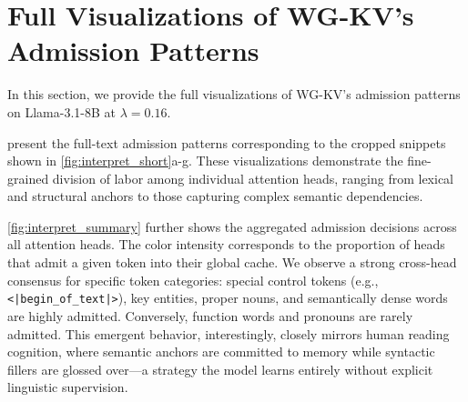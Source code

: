 \section{Full Visualizations of WG-KV's Admission Patterns}
\label{app:interpret}

In this section, we provide the full visualizations of WG-KV's admission patterns on Llama-3.1-8B at $\lambda=0.16$. 

 present the full-text admission patterns corresponding to the cropped snippets shown in \cref{fig:interpret_short}a-g. These visualizations demonstrate the fine-grained division of labor among individual attention heads, ranging from lexical and structural anchors to those capturing complex semantic dependencies.

\cref{fig:interpret_summary} further shows the aggregated admission decisions across all attention heads. The color intensity corresponds to the proportion of heads that admit a given token into their global cache. We observe a strong cross-head consensus for specific token categories: special control tokens (e.g., \texttt{<|begin\_of\_text|>}), key entities, proper nouns, and semantically dense words are highly admitted. Conversely, function words and pronouns are rarely admitted. This emergent behavior, interestingly, closely mirrors human reading cognition, where semantic anchors are committed to memory while syntactic fillers are glossed over---a strategy the model learns entirely without explicit linguistic supervision.








